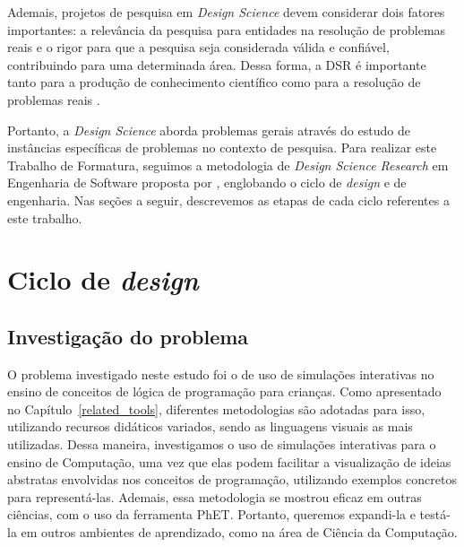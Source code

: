 Ademais, projetos de pesquisa em \textit{Design Science} devem considerar dois fatores importantes: a relevância da pesquisa para entidades na resolução de problemas reais e o rigor para que a pesquisa seja considerada válida e confiável, contribuindo para uma determinada área. Dessa forma, a DSR é importante tanto para a produção de conhecimento científico como para a resolução de problemas reais \citep{dresch2015design, runeson2020design}.

Portanto, a \textit{Design Science} aborda problemas gerais através do estudo de instâncias específicas de problemas no contexto de pesquisa. Para realizar este Trabalho de Formatura, seguimos a metodologia de \textit{Design Science Research} em Engenharia de Software proposta por \citet{wieringa2014design}, englobando o ciclo de \textit{design} e de engenharia. Nas seções a seguir, descrevemos as etapas de cada ciclo referentes a este trabalho.

\section{Ciclo de \textit{design}}

\subsection{Investigação do problema}

O problema investigado neste estudo foi o de uso de simulações interativas no ensino de conceitos de lógica de programação para crianças. Como apresentado no Capítulo~\ref{related_tools}, diferentes metodologias são adotadas para isso, utilizando recursos didáticos variados, sendo as linguagens visuais as mais utilizadas. Dessa maneira, investigamos o uso de simulações interativas para o ensino de Computação, uma vez que elas podem facilitar a visualização de ideias abstratas envolvidas nos conceitos de programação, utilizando exemplos concretos para representá-las. Ademais, essa metodologia se mostrou eficaz em outras ciências, com o uso da ferramenta PhET. Portanto, queremos expandi-la e testá-la em outros ambientes de aprendizado, como na área de Ciência da Computação.

%

